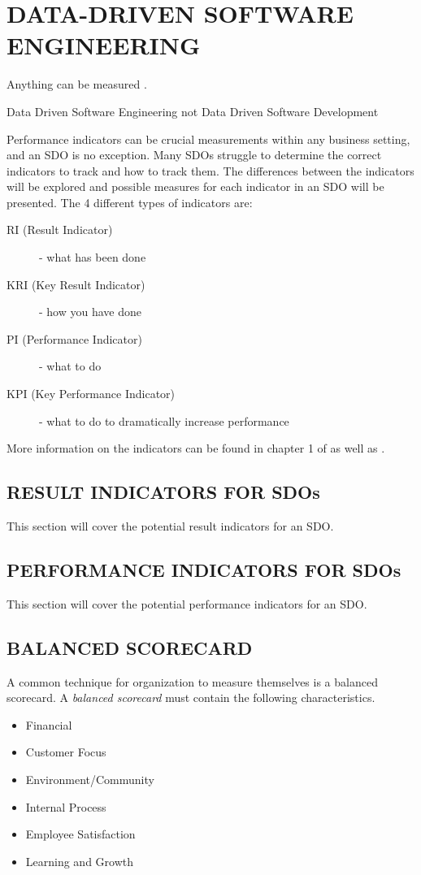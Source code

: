 \documentclass[SDSUThesis.tex]{subfiles}
\begin{document}
\section{DATA-DRIVEN SOFTWARE ENGINEERING}

Anything can be measured \cite{Hubbard2010}.

Data Driven Software Engineering not Data Driven Software Development

Performance indicators can be crucial measurements
within any business setting, and an SDO is no exception. Many
SDOs struggle to determine the correct indicators to track and
how to track them.  
The differences between the indicators will be explored and
possible measures for each indicator in an SDO will be
presented.  The 4 different types of indicators are:
\begin{description}
  \item[RI (Result Indicator)] - what has been done
  \item[KRI (Key Result Indicator)] - how you have done
  \item[PI (Performance Indicator)] - what to do
  \item[KPI (Key Performance Indicator)] - what to do to dramatically increase performance
\end{description}

More information on the indicators can be found
in chapter 1 of \cite{parmenter2010}
as well as \cite{florac1999,kaplan1992}.

\subsection{RESULT INDICATORS FOR SDOs}
    This section will cover the potential result indicators for an SDO.

\subsection{PERFORMANCE INDICATORS FOR SDOs}
    This section will cover the potential performance indicators for an SDO.
    

\subsection{BALANCED SCORECARD}

A common technique for organization to measure themselves is a balanced scorecard.
A \textit{balanced scorecard} must contain the following
characteristics.
\begin{itemize}
  \item Financial 
  \item Customer Focus
  \item Environment/Community
  \item Internal Process
  \item Employee Satisfaction
  \item Learning and Growth
\end{itemize}
\end{document}
